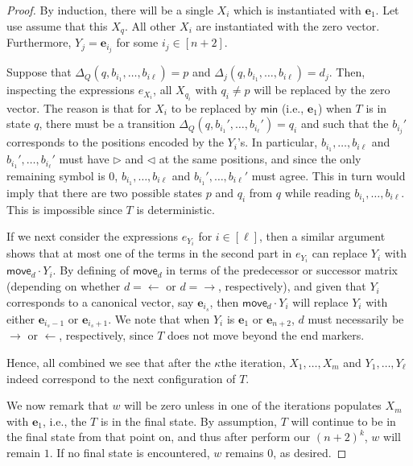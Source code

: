 \begin{proof}
By induction, there will be a single $X_i$ which is instantiated with $\mathbf{e}_1$. Let use assume that this $X_q$. All other $X_i$ are instantiated with the zero vector. Furthermore, $Y_j=\mathbf{e}_{i_j}$ for some $i_j\in[n+2]$. 

Suppose that
$\Delta_Q(q,b_{i_1},\ldots,b_{i\ell})=p$ and
$\Delta_j(q,b_{i_1},\ldots,b_{i\ell})=d_j$. Then, inspecting the expressions $e_{X_i}$, all $X_{q_i}$ with $q_i\neq p$ will be replaced by the zero vector. The reason is that for $X_i$ to be replaced by $\mathsf{min}$ (i.e., $\mathbf{e}_1$) when $T$ is in state $q$,
there must be a transition $\Delta_Q(q,b_{i_1}',\ldots,b_{i_\ell}')=q_i$
and such that the $b_{i_j}'$ corresponds to the positions encoded by
the $Y_i$'s. In particular, $b_{i_1},\ldots,b_{i\ell}$ and 
$b_{i_1}',\ldots,b_{i_\ell}'$ must have $\rhd$ and $\lhd$ at the same positions, and since the only remaining symbol is $0$, $b_{i_1},\ldots,b_{i\ell}$ and $b_{i_1}',\ldots,b_{i\ell}'$ must agree.
This in turn would imply that there are two possible states $p$ and $q_i$ from $q$ while reading $b_{i_1},\ldots,b_{i\ell}$. This is impossible since $T$ is deterministic.

If we next consider the expressions $e_{Y_i}$ for $i\in[\ell]$, then a similar argument shows that at most one of the terms in the second part in $e_{Y_i}$ can replace $Y_i$ with $\mathsf{move}_d\cdot Y_i$. By defining of $\mathsf{move}_d$ in terms of the predecessor or successor matrix (depending on whether $d=\gets$ or $d=\to$, respectively), and given that $Y_i$ corresponds to a canonical vector, say $\mathbf{e}_{i_s}$, then $\mathsf{move}_d\cdot Y_i$ will replace $Y_i$
with either $\mathbf{e}_{i_s-1}$ or  $\mathbf{e}_{i_s+1}$. We note that when $Y_i$ is $\mathbf{e}_1$ or $\mathbf{e}_{n+2}$, $d$ must necessarily be $\to$ or $\gets$, respectively, since $T$ does not move beyond the end markers. 

Hence, all combined we see that after the $\kappa$the iteration, $X_1,\ldots,X_m$ and $Y_1,\ldots,Y_\ell$ indeed correspond to the next configuration of $T$.

We now remark that $w$ will be zero unless in one of the iterations populates $X_m$ with $\mathbf{e}_{1}$, i.e., the $T$ is in the final state. By assumption, $T$ will continue to be in the final state from that point on, and thus after perform our $(n+2)^k$, $w$ will remain $1$. If no final state is encountered, $w$ remains $0$, as desired.
\end{proof}
